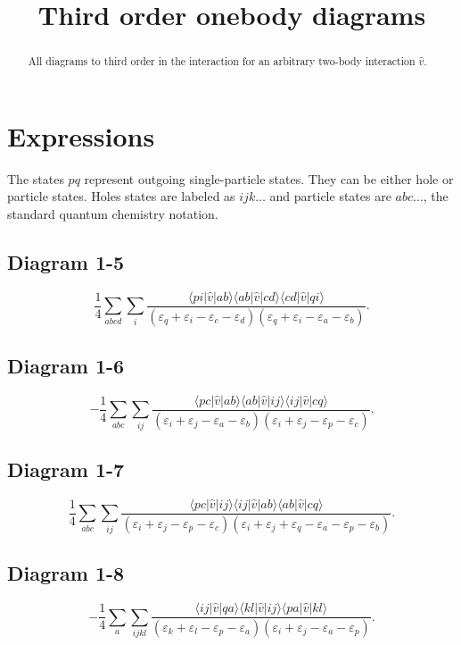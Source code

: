 \documentclass[aps,preprint,amsmath,amssymb]{revtex4-1}
\begin{document}
\title{Third order onebody diagrams}


\author{ } 

\begin{abstract} 
All diagrams to third order in the interaction for an arbitrary two-body interaction $\hat{v}$.
\end{abstract}


\maketitle

\section*{Expressions}
The states $pq$ represent outgoing single-particle states. They can be either hole or particle states.
Holes states are labeled as $ijk\dots$ and particle states are $abc\dots$, the standard quantum chemistry notation. 
\subsection*{Diagram 1-5}
\[
\frac{1}{4}\sum_{abcd}\sum_{i}\frac{\langle pi| \hat{v} |ab  \rangle \langle ab| \hat{v} |cd  \rangle \langle cd| \hat{v} |qi  \rangle }{(\varepsilon_q+\varepsilon_i-\varepsilon_c-\varepsilon_d) (\varepsilon_q+\varepsilon_i-\varepsilon_a-\varepsilon_b)}.
\]

\subsection*{Diagram 1-6}
\[
-\frac{1}{4}\sum_{abc}\sum_{ij}\frac{\langle pc| \hat{v} |ab  \rangle \langle ab| \hat{v} |ij  \rangle \langle ij| \hat{v} |cq  \rangle }{(\varepsilon_i+\varepsilon_j-\varepsilon_a-\varepsilon_b) (\varepsilon_i+\varepsilon_j-\varepsilon_p-\varepsilon_c)}.
\]
\subsection*{Diagram 1-7}
\[
\frac{1}{4}\sum_{abc}\sum_{ij}\frac{\langle pc| \hat{v} |ij  \rangle \langle ij| \hat{v} |ab  \rangle \langle ab| \hat{v} |cq  \rangle }{(\varepsilon_i+\varepsilon_j-\varepsilon_p-\varepsilon_c) (\varepsilon_i+\varepsilon_j+\varepsilon_q-\varepsilon_a-\varepsilon_p-\varepsilon_b)}.
\]

\subsection*{Diagram 1-8}
\[
-\frac{1}{4}\sum_{a}\sum_{ijkl}\frac{\langle ij| \hat{v} |qa  \rangle \langle kl| \hat{v} |ij  \rangle \langle pa| \hat{v} |kl  \rangle }{(\varepsilon_k+\varepsilon_l-\varepsilon_p-\varepsilon_a) (\varepsilon_i+\varepsilon_j-\varepsilon_a-\varepsilon_p)}.
\]
\end{document}
